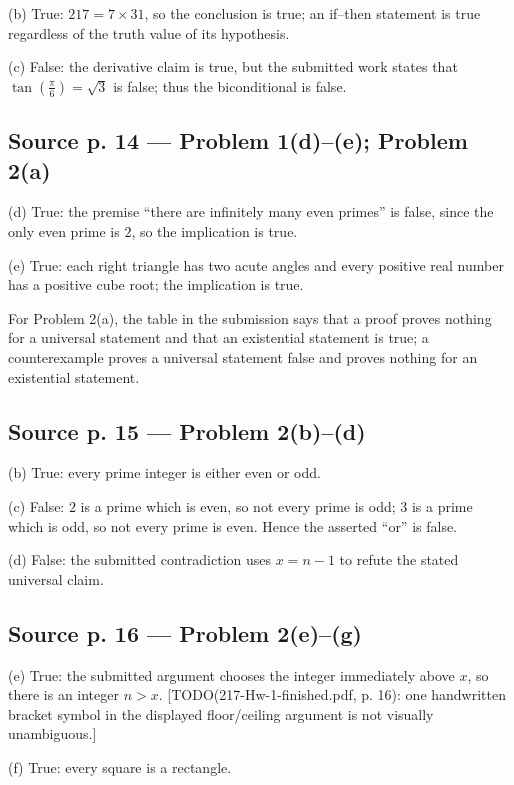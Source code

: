 (b) True: \(217 = 7 \times 31\), so the conclusion is true; an if--then statement is true regardless of the truth value of its hypothesis.

(c) False: the derivative claim is true, but the submitted work states that \(\tan\left( \frac{\pi}{6} \right) = \sqrt{3}\) is false; thus the biconditional is false.

\subsection{Source p. 14 --- Problem 1(d)--(e); Problem 2(a)}

(d) True: the premise ``there are infinitely many even primes'' is false, since the only even prime is \(2\), so the implication is true.

(e) True: each right triangle has two acute angles and every positive real number has a positive cube root; the implication is true.

For Problem 2(a), the table in the submission says that a proof proves nothing for a universal statement and that an existential statement is true; a counterexample proves a universal statement false and proves nothing for an existential statement.

\subsection{Source p. 15 --- Problem 2(b)--(d)}

(b) True: every prime integer is either even or odd.

(c) False: \(2\) is a prime which is even, so not every prime is odd; \(3\) is a prime which is odd, so not every prime is even. Hence the asserted ``or'' is false.

(d) False: the submitted contradiction uses \(x = n - 1\) to refute the stated universal claim.

\subsection{Source p. 16 --- Problem 2(e)--(g)}

(e) True: the submitted argument chooses the integer immediately above \(x\), so there is an integer \(n > x\). {[}TODO(217-Hw-1-finished.pdf, p. 16): one handwritten bracket symbol in the displayed floor/ceiling argument is not visually unambiguous.{]}

(f) True: every square is a rectangle.

